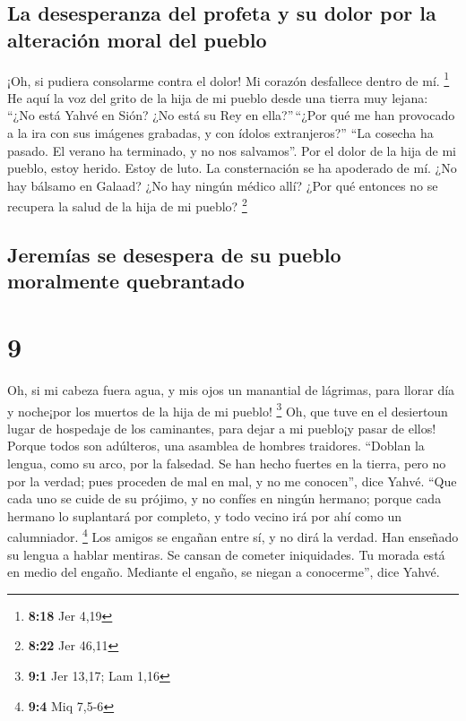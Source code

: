 \hypertarget{la-desesperanza-del-profeta-y-su-dolor-por-la-alteraciuxf3n-moral-del-pueblo}{%
\subsection{La desesperanza del profeta y su dolor por la alteración
moral del
pueblo}\label{la-desesperanza-del-profeta-y-su-dolor-por-la-alteraciuxf3n-moral-del-pueblo}}

 ¡Oh, si pudiera consolarme contra el dolor! Mi corazón
desfallece dentro de mí. \footnote{\textbf{8:18} Jer 4,19}
 He aquí la voz del grito de la hija de mi pueblo desde
una tierra muy lejana: ``¿No está Yahvé en Sión? ¿No está su Rey en
ella?''\,``¿Por qué me han provocado a la ira con sus imágenes grabadas,
y con ídolos extranjeros?''  ``La cosecha ha pasado. El
verano ha terminado, y no nos salvamos''.  Por el dolor
de la hija de mi pueblo, estoy herido. Estoy de luto. La consternación
se ha apoderado de mí.  ¿No hay bálsamo en Galaad? ¿No
hay ningún médico allí? ¿Por qué entonces no se recupera la salud de la
hija de mi pueblo? \footnote{\textbf{8:22} Jer 46,11}

\hypertarget{jeremuxedas-se-desespera-de-su-pueblo-moralmente-quebrantado}{%
\subsection{Jeremías se desespera de su pueblo moralmente
quebrantado}\label{jeremuxedas-se-desespera-de-su-pueblo-moralmente-quebrantado}}

\hypertarget{section-8}{%
\section{9}\label{section-8}}

 Oh, si mi cabeza fuera agua, y mis ojos un manantial de
lágrimas, para llorar día y noche¡por los muertos de la hija de mi
pueblo! \footnote{\textbf{9:1} Jer 13,17; Lam 1,16}  Oh,
que tuve en el desiertoun lugar de hospedaje de los caminantes, para
dejar a mi pueblo¡y pasar de ellos! Porque todos son adúlteros, una
asamblea de hombres traidores.  ``Doblan la lengua, como
su arco, por la falsedad. Se han hecho fuertes en la tierra, pero no por
la verdad; pues proceden de mal en mal, y no me conocen'', dice Yahvé.
 ``Que cada uno se cuide de su prójimo, y no confíes en
ningún hermano; porque cada hermano lo suplantará por completo, y todo
vecino irá por ahí como un calumniador. \footnote{\textbf{9:4} Miq 7,5-6}
 Los amigos se engañan entre sí, y no dirá la verdad. Han
enseñado su lengua a hablar mentiras. Se cansan de cometer iniquidades.
 Tu morada está en medio del engaño. Mediante el engaño,
se niegan a conocerme'', dice Yahvé.

